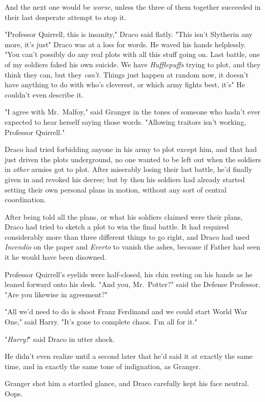 And the next one would be \emph{worse}, unless the three of them together
succeeded in their last desperate attempt to stop it.

"Professor Quirrell, this is insanity," Draco said flatly. "This isn't
Slytherin any more, it's just{\el}" Draco was at a loss for words. He
waved his hands helplessly. "You can't possibly do any real plots with all this
stuff going on. Last battle, one of my soldiers faked his own suicide. We have
\emph{Hufflepuffs} trying to plot, and they think they can, but they
\emph{can't.} Things just happen at random now, it doesn't have anything to do
with who's cleverest, or which army fights best, it's{\el}" He couldn't even
describe it.

"I agree with Mr.~Malfoy," said Granger in the tones of someone who hadn't ever
expected to hear herself saying those words. "Allowing traitors isn't working,
Professor Quirrell."

Draco had tried forbidding anyone in his army to plot except him, and that had
just driven the plots underground, no one wanted to be left out when the
soldiers in \emph{other} armies got to plot. After miserably losing their last
battle, he'd finally given in and revoked his decree; but by then his soldiers
had already started setting their own personal plans in motion, without any
sort of central coordination.

After being told all the plans, or what his soldiers claimed were their plans,
Draco had tried to sketch a plot to win the final battle. It had required
considerably more than three different things to go right, and Draco had used
\emph{Incendio} on the paper and \emph{Everto} to vanish the ashes, because if
Father had seen it he would have been disowned.

Professor Quirrell's eyelids were half-closed, his chin resting on his hands as
he leaned forward onto his desk. "And you, Mr.~Potter?" said the Defense
Professor. "Are you likewise in agreement?"

"All we'd need to do is shoot Franz Ferdinand and we could start World War
One," said Harry. "It's gone to complete chaos. I'm all for it."

"\emph{Harry!}" said Draco in utter shock.

He didn't even realize until a second later that he'd said it at exactly the
same time, and in exactly the same tone of indignation, as Granger.

Granger shot him a startled glance, and Draco carefully kept his face neutral.
Oops.

